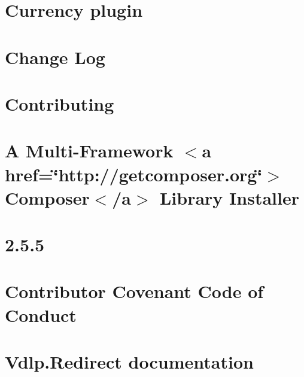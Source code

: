 \let\mypdfximage\pdfximage\def\pdfximage{\immediate\mypdfximage}\documentclass[twoside]{book}
\newcommand{\+}{\discretionary{\mbox{\scriptsize$\hookleftarrow$}}{}{}}
\begin{document}
\chapter{Currency plugin}
\label{md_responsiv_currency__r_e_a_d_m_e}

\chapter{Change Log}
\label{md_responsiv_currency_vendor_composer_installers__c_h_a_n_g_e_l_o_g}

\chapter{Contributing}
\label{md_responsiv_currency_vendor_composer_installers__c_o_n_t_r_i_b_u_t_i_n_g}

\chapter{A Multi-\/\+Framework $<$a href=\char`\"{}http\+://getcomposer.\+org\char`\"{}$>$Composer$<$/a$>$ Library Installer}
\label{md_responsiv_currency_vendor_composer_installers__r_e_a_d_m_e}

\chapter{2.5.5}
\label{md_vdlp_redirect__c_h_a_n_g_e_l_o_g}

\chapter{Contributor Covenant Code of Conduct}
\label{md_vdlp_redirect__c_o_d_e__o_f__c_o_n_d_u_c_t}

\chapter{Vdlp.\+Redirect documentation}
\label{md_vdlp_redirect__d_o_c_u_m_e_n_t_a_t_i_o_n}

\end{document}
